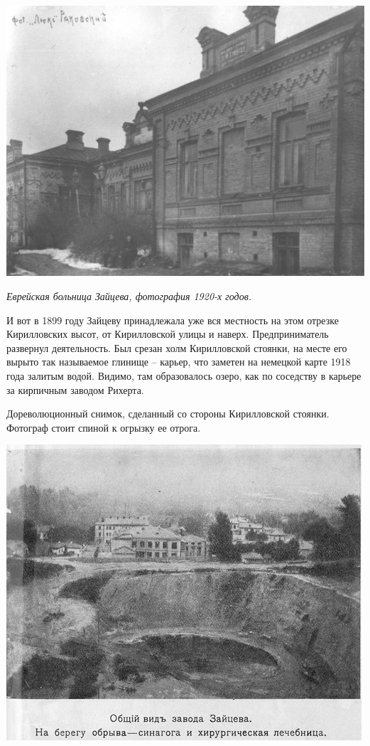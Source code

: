 \begin{center}
\includegraphics[width=0.90\linewidth]{chast-kirvys/beylis/zaicev-boln-perv-korpus-1920.jpg}

\textit{Еврейская больница Зайцева, фотография 1920-х годов.}
\end{center}

И вот в 1899 году Зайцеву принадлежала уже вся местность на этом отрезке Кирилловских высот, от Кирилловской улицы и наверх. Предприниматель развернул деятельность. Был срезан холм Кирилловской стоянки, на месте его вырыто так называемое глинище – карьер, что заметен на немецкой карте 1918 года залитым водой. Видимо, там образовалось озеро, как по соседству в карьере за кирпичным заводом Рихерта.


Дореволюционный снимок, сделанный со стороны Кирилловской стоянки. Фотограф стоит спиной к огрызку ее отрога.

\begin{center}
\includegraphics[width=\linewidth]{chast-kirvys/beylis/zavod-zaiceva.png}
\end{center}

